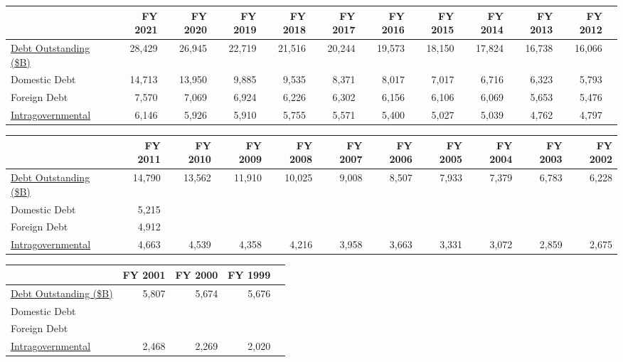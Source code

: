 \documentclass{article}
\begin{document}
    \begin{table}[h]
      \begin{tabular}{lrrrrrrrrrrr}
      \hline
      & FY 2021 & FY 2020 & FY 2019 & FY 2018 & FY 2017 & FY 2016 & FY 2015 & FY 2014 & FY 2013 & FY 2012 \\
      \hline
      \href{https://www.treasurydirect.gov/govt/reports/pd/histdebt/histdebt\_histo5.htm}{Debt Outstanding (\$B)} & 28,429 & 26,945 & 22,719 & 21,516 & 20,244 & 19,573 & 18,150 & 17,824 & 16,738 & 16,066 \\
      Domestic Debt & 14,713 & 13,950 & 9,885 & 9,535 & 8,371 & 8,017 & 7,017 & 6,716 & 6,323 & 5,793 \\
      Foreign Debt & 7,570 & 7,069 & 6,924 & 6,226 & 6,302 & 6,156 & 6,106 & 6,069 & 5,653 & 5,476 \\
      \href{https://fiscaldata.treasury.gov/datasets/debt-to-the-penny/debt-to-the-penny}{Intragovernmental} & 6,146 & 5,926 & 5,910 & 5,755 & 5,571 & 5,400 & 5,027 & 5,039 & 4,762 & 4,797 \\
      \hline
      \end{tabular}
    \end{table}

    \begin{table}[H]
      \begin{tabular}{lrrrrrrrrrr}
      \hline
      & FY 2011 & FY 2010 & FY 2009 & FY 2008 & FY 2007 & FY 2006 & FY 2005 & FY 2004 & FY 2003 & FY 2002 \\
      \hline
      \href{https://www.treasurydirect.gov/govt/reports/pd/histdebt/histdebt\_histo5.htm}{Debt Outstanding (\$B)} & 14,790 & 13,562 & 11,910 & 10,025 & 9,008 & 8,507 & 7,933 & 7,379 & 6,783 & 6,228 \\
      Domestic Debt & 5,215 & & & & & & & & & \\
      Foreign Debt & 4,912 & & & & & & & & & \\
      \href{https://fiscaldata.treasury.gov/datasets/debt-to-the-penny/debt-to-the-penny}{Intragovernmental} & 4,663 & 4,539 & 4,358 & 4,216 & 3,958 & 3,663 & 3,331 & 3,072 & 2,859 & 2,675 \\
      \hline
      \end{tabular}
    \end{table}
    
    \begin{table}[H]
      \begin{tabular}{lrrrr}
      \hline
      & FY 2001 & FY 2000 & FY 1999 \\
      \hline
      \href{https://www.treasurydirect.gov/govt/reports/pd/histdebt/histdebt\_histo5.htm}{Debt Outstanding (\$B)} & 5,807 & 5,674 & 5,676 \\
      Domestic Debt & & & \\
      Foreign Debt & & & \\
      \href{https://fiscaldata.treasury.gov/datasets/debt-to-the-penny/debt-to-the-penny}{Intragovernmental} & 2,468 & 2,269 & 2,020 \\
      \hline
      \end{tabular}
    \end{table}
\end{document}
